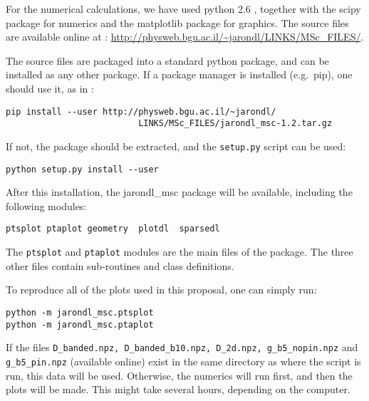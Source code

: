 For the numerical calculations, we have used python 2.6 \cite{guido_van_rossum_python}, together
with the scipy \cite{jones_scipy} package for numerics and the matplotlib \cite{hunter_matplotlib:_2007} package
for graphics. The source files are available online at : 
\url{http://physweb.bgu.ac.il/~jarondl/LINKS/MSc_FILES/}.


The source files are packaged into a standard python package,
and can be installed as any other package. If a package manager is installed (e.g.\ pip),
one should use it, as in :
\begin{verbatim}
pip install --user http://physweb.bgu.ac.il/~jarondl/
                          LINKS/MSc_FILES/jarondl_msc-1.2.tar.gz
\end{verbatim}
If not, the package should be extracted, and the \texttt{setup.py} script can be used:
\begin{verbatim}
python setup.py install --user
\end{verbatim}
After this installation, the jarondl\_msc package will be available,
including the following modules:
\begin{verbatim}
ptsplot ptaplot geometry  plotdl  sparsedl
\end{verbatim}

The \texttt{ptsplot} and \texttt{ptaplot} modules are the main files of the package. The three other files contain
sub-routines and class definitions.


To reproduce all of the plots used in this proposal, one can simply run:
\begin{verbatim}
python -m jarondl_msc.ptsplot
python -m jarondl_msc.ptaplot
\end{verbatim}
If the files \texttt{D\_banded.npz, D\_banded\_b10.npz, D\_2d.npz, g\_b5\_nopin.npz} and \texttt{g\_b5\_pin.npz} (available online)
exist in the same directory as where the script is run,
this data will be used. Otherwise, the numerics will run first, and then the plots will be made. This might take several hours,
depending on the computer.



